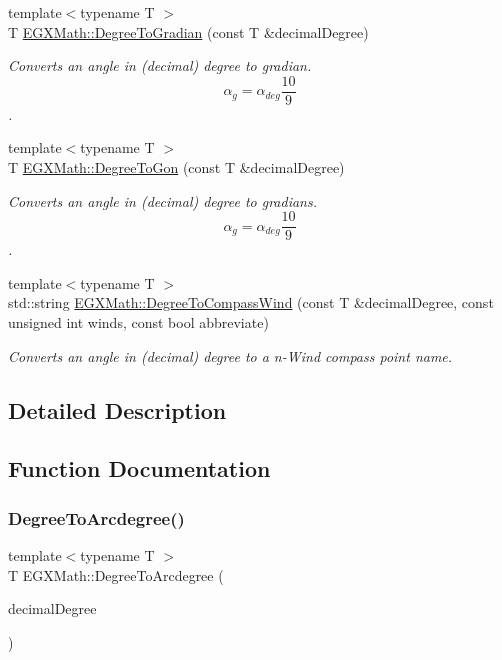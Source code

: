 \begin{DoxyCompactItemize}
{\footnotesize template$<$typename T $>$ }\\T \mbox{\hyperlink{group___e_g_x_math-_angle_conversions-_degree_ga25bb5506b3f66fff7a1b85bf7bd795b3}{E\+G\+X\+Math\+::\+Degree\+To\+Gradian}} (const T \&decimal\+Degree)
\begin{DoxyCompactList}\small\item\em Converts an angle in (decimal) degree to gradian. \[\alpha_{g}=\alpha_{deg}\frac{10}{9}\]. \end{DoxyCompactList}\item 
{\footnotesize template$<$typename T $>$ }\\T \mbox{\hyperlink{group___e_g_x_math-_angle_conversions-_degree_ga87c3fab0867021e5d2501197b4db6194}{E\+G\+X\+Math\+::\+Degree\+To\+Gon}} (const T \&decimal\+Degree)
\begin{DoxyCompactList}\small\item\em Converts an angle in (decimal) degree to gradians. \[\alpha_{g}=\alpha_{deg}\frac{10}{9}\]. \end{DoxyCompactList}\item 
{\footnotesize template$<$typename T $>$ }\\std\+::string \mbox{\hyperlink{group___e_g_x_math-_angle_conversions-_degree_ga5ffef873bcec300ab90570ad6e7b1ab1}{E\+G\+X\+Math\+::\+Degree\+To\+Compass\+Wind}} (const T \&decimal\+Degree, const unsigned int winds, const bool abbreviate)
\begin{DoxyCompactList}\small\item\em Converts an angle in (decimal) degree to a n-\/\+Wind compass point name. \end{DoxyCompactList}\end{DoxyCompactItemize}


\subsection{Detailed Description}


\subsection{Function Documentation}
\mbox{\label{group___e_g_x_math-_angle_conversions-_degree_gac1b5f3b68f66c77a6df4ceef842c9b19}} 
\subsubsection{\texorpdfstring{Degree\+To\+Arcdegree()}{DegreeToArcdegree()}}
{\footnotesize\ttfamily template$<$typename T $>$ \\
T E\+G\+X\+Math\+::\+Degree\+To\+Arcdegree (\begin{DoxyParamCaption}\item[{const T \&}]{decimal\+Degree }\end{DoxyParamCaption})}



